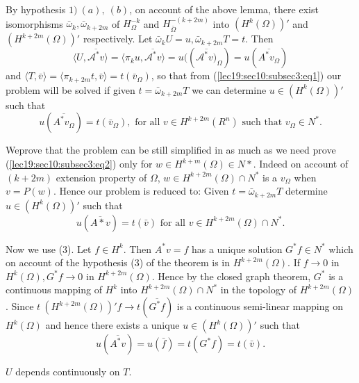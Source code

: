 By hypothesis $1) ~ (a), ~ (b)$, on account of the above lemma, there
exist isomorphisms 	$\bar{\omega}_k, \bar{\omega}_{k + 2m}$ of
$H^{-k}_{\Omega}$ and $H^{-(k+2m)}_{\bar{\Omega}}$ into $(H^k
(\Omega))'$ and $(H^{k+2m}(\Omega))'$ respectively. Let
$\bar{\omega}_k U = u, {\bar{\omega}}_{k+2m} T = t$. Then 
$$
\langle U, \overline{\mathscr{A}^* v} \rangle = \langle \pi_k u,
\overline{\mathscr{A}^* v} \rangle = u((\overline{\mathscr{A}^*
  v)}_\Omega) = u (\overline{A^* v_\Omega}) 
$$
and $\langle T, \bar{v} \rangle = \langle{\pi}_{k + 2m} t, \bar{v}
\rangle = t(\bar{v}_\Omega )$, so that from (\ref{lec19:sec10:subsec3:eq1}) our problem will be
solved if given $t = \bar{\omega}_{k + 2m} T$ we can determine $u
\in (H^k (\Omega))'$ such that  
\begin{equation*}
u(\overline{A^* v_\Omega}) = t (\bar{v}_\Omega), \text { for all } v
\in H^{k + 2m}(R^n) \text { such that } v_\Omega \in
N^*. \tag{2}\label{lec19:sec10:subsec3:eq2} 
\end{equation*}

We\pageoriginale prove that the problem can be still simplified in as much as we
need prove (\ref{lec19:sec10:subsec3:eq2}) only for $w \in H^{k + m} (\Omega)
\in N*$. Indeed on account of $(k + 2m)$ extension property of
$\Omega$, $w \in H^{k+2m}(\Omega) \cap N^*$ is a $v _\Omega$
when $v = P(w)$. Hence our problem is reduced to: Given $ t =
\bar{\omega}_{k+2m} T$ determine $u \in(H^k (\Omega))'$ such
that 
$$
u (\overline{A* v}) = t(\bar{v}) \text { for all } v \in H^{k
  + 2m}(\Omega) \cap N^*.  
$$

Now we use (3). Let $f \in H^k$. Then $A^* v = f$ has a
unique solution $G^*f \in N^*$ which on account of the
hypothesis (3) of the theorem is in $H^{k + 2m}(\Omega)$. If $ f \to
0$ in $H^k (\Omega), G^*f \to 0$ in $H^{k + 2m}(\Omega)$. Hence by the
closed graph theorem, $G^*$ is a continuous mapping of $H^k$ into $H^{k
  + 2m}(\Omega) \cap N^*$ in the topology of $H^{k + 2m}
(\Omega)$. Since $t ~ (H^{k + 2m}(\Omega))' f \to t (\overline{G^*f})$
is a continuous semi-linear mapping on $H^k (\Omega)$ and hence there
exists a unique $u \in (H^k (\Omega))'$ such that  
$$
u (\overline{A^* v}) = u (\bar{f}) = t (G^*f) = t (\bar{v}). 
$$
\begin{remark*} %
  $U$ depends continuously on $T$. 
\end{remark*}
